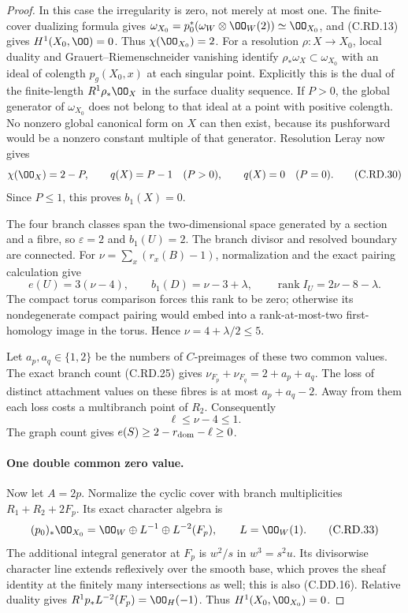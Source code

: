 \begin{proof}
In this case the irregularity is zero, not
merely at most one. The finite-cover dualizing
formula gives
$\omega_{X_0}=p_0^*(\omega_W\otimes\OO_W(2))
\simeq\OO_{X_0}$, and (C.RD.13) gives
$H^1(X_0,\OO)=0$. Thus $\chi(\OO_{X_0})=2$.
For a resolution $\rho:X\to X_0$, local duality
and Grauert--Riemenschneider vanishing identify
$\rho_*\omega_X\subset\omega_{X_0}$ with an
ideal of colength $p_g(X_0,x)$ at each singular
point. Explicitly this is the dual of the
finite-length $R^1\rho_*\OO_X$ in the surface
duality sequence. If $P>0$, the global generator
of $\omega_{X_0}$ does not belong to that ideal
at a point with positive colength. No nonzero
global canonical form on $X$ can then exist,
because its pushforward would be a nonzero
constant multiple of that generator.
Resolution Leray now gives
\[
 \chi(\OO_X)=2-P,
 \qquad q(X)=P-1\quad(P>0),
 \qquad q(X)=0\quad(P=0).
\tag{C.RD.30}\label{cdp:eq:C.RD.30}
\]
Since $P\le1$, this proves $b_1(X)=0$.

The four branch classes span the two-dimensional
space generated by a section and a fibre, so
$\varepsilon=2$ and $b_1(U)=2$.
The branch divisor and resolved boundary are
connected. For
$\nu=\sum_x(r_x(B)-1)$, normalization and the
exact pairing calculation give
\[
 e(U)=3(\nu-4),\qquad b_1(D)=\nu-3+\lambda,
 \qquad \operatorname{rank}I_U=2\nu-8-\lambda.
\tag{C.RD.31}\label{cdp:eq:C.RD.31}
\]
The compact torus comparison forces this rank
to be zero; otherwise its nondegenerate compact
pairing would embed into a rank-at-most-two
first-homology image in the torus. Hence
$\nu=4+\lambda/2\le5$.

Let $a_p,a_q\in\{1,2\}$ be the numbers of
$C$-preimages of these two common values.
The exact branch count (C.RD.25) gives
$\nu_{F_p}+\nu_{F_q}=2+a_p+a_q$.
The loss of distinct attachment values on
these fibres is at most $a_p+a_q-2$.
Away from them each loss costs a multibranch
point of $R_2$. Consequently
\[
                    \ell\le\nu-4\le1.
\tag{C.RD.32}\label{cdp:eq:C.RD.32}
\]
The graph count gives
$e(S)\ge2-r_{\rm dom}-\ell\ge0$.

\paragraph{One double common zero value.}
Now let $A=2p$. Normalize the cyclic cover
with branch multiplicities $R_1+R_2+2F_p$.
Its exact character algebra is
\[
 (p_0)_*\OO_{X_0}
       =\OO_W\oplus L^{-1}\oplus L^{-2}(F_p),
                  \qquad L=\OO_W(1).
\tag{C.RD.33}\label{cdp:eq:C.RD.33}
\]
The additional integral generator at $F_p$
is $w^2/s$ in $w^3=s^2u$. Its divisorwise
character line extends reflexively over the
smooth base, which proves the sheaf identity
at the finitely many intersections as well;
this is also (C.DD.16). Relative duality gives
$R^1p_*L^{-2}(F_p)=\OO_H(-1)$.
Thus $H^1(X_0,\OO_{X_0})=0$.


\end{proof}
